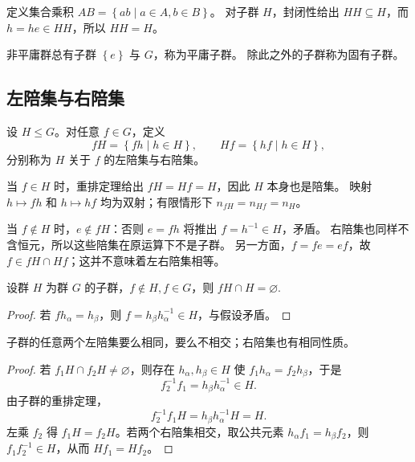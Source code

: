 定义集合乘积 $AB=\left\{ab\mid a\in A,b\in B\right\}$。
对子群 $H$，封闭性给出 $HH\subseteq H$，而 $h=he\in HH$，所以 $HH=H$。

非平庸群总有子群 $\left\{e\right\}$ 与 $G$，称为平庸子群。
除此之外的子群称为固有子群。

\subsection{左陪集与右陪集}
\begin{definition}[陪集]
设 $H\leq G$。对任意 $f\in G$，定义
\begin{equation}
fH=\left\{fh\mid h\in H\right\},\qquad Hf=\left\{hf\mid h\in H\right\},
\end{equation}
分别称为 $H$ 关于 $f$ 的左陪集与右陪集。
\end{definition}
当 $f\in H$ 时，重排定理给出 $fH=Hf=H$，因此 $H$ 本身也是陪集。
映射 $h\mapsto fh$ 和 $h\mapsto hf$ 均为双射；有限情形下
$n_{fH}=n_{Hf}=n_H$。

当 $f\notin H$ 时，$e\notin fH$：否则 $e=fh$ 将推出 $f=h^{-1}\in H$，矛盾。
右陪集也同样不含恒元，所以这些陪集在原运算下不是子群。
另一方面，$f=fe=ef$，故 $f\in fH\cap Hf$；这并不意味着左右陪集相等。


\begin{theorem}
       设群 $H $ 为群 $G $ 的子群，$f\notin H, f\in G $，则 $fH\cap H = \varnothing .$
\end{theorem}

\begin{proof}
       若 $fh_\alpha=h_\beta$，则 $f=h_\beta h_\alpha^{-1}\in H$，与假设矛盾。
\end{proof}

\begin{theorem}[陪集定理]
子群的任意两个左陪集要么相同，要么不相交；右陪集也有相同性质。
\end{theorem}
\begin{proof}
若 $f_1H\cap f_2H\ne\varnothing$，则存在 $h_\alpha,h_\beta\in H$ 使
$f_1h_\alpha=f_2h_\beta$，于是
\begin{equation}
f_2^{-1}f_1=h_\beta h_\alpha^{-1}\in H.
\end{equation}
由子群的重排定理，
\begin{equation}
f_2^{-1}f_1H=h_\beta h_\alpha^{-1}H=H.
\end{equation}
左乘 $f_2$ 得 $f_1H=f_2H$。若两个右陪集相交，取公共元素
$h_\alpha f_1=h_\beta f_2$，则 $f_1f_2^{-1}\in H$，从而 $Hf_1=Hf_2$。
\end{proof}

